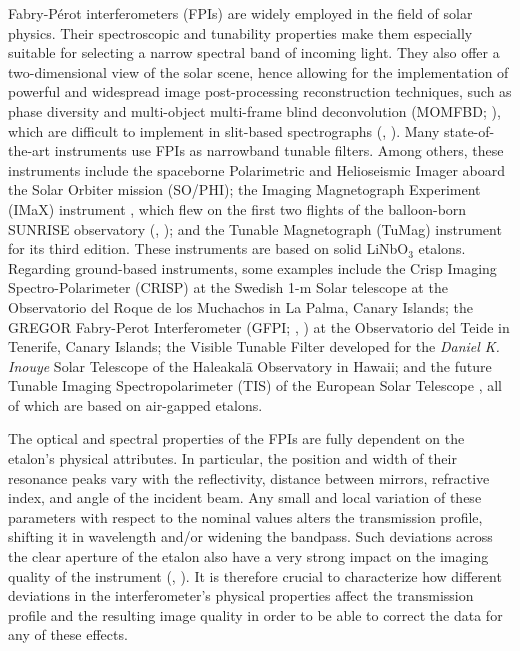 Fabry-Pérot interferometers (FPIs) are widely employed in the field of solar physics. Their spectroscopic and tunability properties make them especially suitable for selecting a narrow spectral band of incoming light. They also offer a two-dimensional view of the solar scene, hence allowing for the implementation of powerful and widespread image post-processing reconstruction techniques, such as phase diversity \citep{PD_etalon} and multi-object multi-frame blind deconvolution (MOMFBD; \citealt{mombfd}), which are difficult to implement in slit-based spectrographs (\citealt{image_spectro}, \citealt{image_spectro_2}). Many state-of-the-art instruments use FPIs as narrowband tunable filters. Among others, these instruments include the spaceborne Polarimetric and Helioseismic Imager \citep[][]{PHI} aboard the Solar Orbiter mission \citep[][]{SO} (SO/PHI); the Imaging Magnetograph Experiment (IMaX) instrument \citep[][]{IMaX}, which flew on the first two flights of the balloon-born SUNRISE observatory (\citealt{SunriseI}, \citealt{SunriseII}); and the Tunable Magnetograph (TuMag) instrument for its third edition. These instruments are based on solid LiNbO$_3$ etalons. Regarding ground-based instruments, some examples include the Crisp Imaging Spectro-Polarimeter (CRISP) at the Swedish 1-m Solar telescope \citep[][]{crisp} at the Observatorio del Roque de los Muchachos in La Palma, Canary Islands; the GREGOR Fabry-Perot Interferometer (GFPI; \citealt{GFPI}, \citealt{GREGOR}) at the Observatorio del Teide in Tenerife, Canary Islands; the Visible Tunable Filter \citep[VTF;][]{VTF} developed for the \textit{Daniel K. Inouye} Solar Telescope \citep[DKIST;][]{DKIST} of the Haleakal\=a Observatory in Hawaii; and the future Tunable Imaging Spectropolarimeter (TIS) of the European Solar Telescope \citep{EST}, all of which are based on air-gapped etalons. 

The optical and spectral properties of the FPIs are fully dependent on the etalon's physical attributes. In particular, the position and width of their resonance peaks vary with the reflectivity, distance between mirrors, refractive index, and angle of the incident beam. Any small and local variation of these parameters with respect to the nominal values alters the transmission profile, shifting it in wavelength and/or widening the bandpass. Such deviations across the clear aperture of the etalon also have a very strong impact on the imaging quality of the instrument (\citealt{ghosts-etalon}, \citealt{franIV}). It is therefore crucial to characterize how different deviations in the interferometer's physical properties affect the transmission profile and the resulting image quality in order to be able to correct the data for any of these effects.

